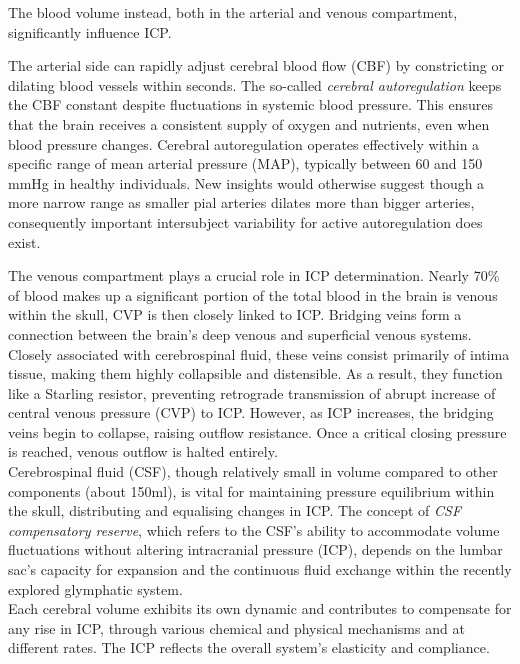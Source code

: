 The blood volume instead, both in the arterial and venous compartment, significantly influence ICP. 

The arterial side can rapidly adjust cerebral blood flow (CBF) by constricting or dilating blood vessels within seconds. The so-called \textit{cerebral autoregulation} keeps the CBF constant despite fluctuations in systemic blood pressure. This ensures that the brain receives a consistent supply of oxygen and nutrients, even when blood pressure changes. Cerebral autoregulation operates effectively within a specific range of mean arterial pressure (MAP), typically between 60 and 150 mmHg in healthy individuals. New insights would otherwise suggest though a more narrow range as smaller pial arteries dilates more than bigger arteries, consequently important intersubject variability for active autoregulation does exist\cite{kleinDifferentialHemodynamicResponse2022}. 

The venous compartment plays a crucial role in ICP determination. Nearly 70\% of blood makes up a significant portion of the total blood in the brain is venous within the skull, CVP is then closely linked to ICP. Bridging veins form a connection between the brain’s deep venous and superficial venous systems. Closely associated with cerebrospinal fluid, these veins consist primarily of intima tissue, making them highly collapsible and distensible. As a result, they function like a Starling resistor, preventing retrograde transmission of abrupt increase of central venous pressure (CVP) to ICP. However, as ICP increases, the bridging veins begin to collapse, raising outflow resistance. Once a critical closing pressure is reached, venous outflow is halted entirely\cite{wilsonMonroKellie20Dynamic2016}.\\

Cerebrospinal fluid (CSF), though relatively small in volume compared to other components (about 150ml), is vital for maintaining pressure equilibrium within the skull, distributing and equalising changes in ICP. The concept of \textit{CSF compensatory reserve}, which refers to the CSF’s ability to accommodate volume fluctuations without altering intracranial pressure (ICP), depends on the lumbar sac’s capacity for expansion and the continuous fluid exchange within the recently explored glymphatic system\cite{cuccioliniIntracranialPressureClinicians2023a}.\\

Each cerebral volume exhibits its own dynamic and contributes to compensate for any rise in ICP, through various chemical and physical mechanisms and at different rates. The ICP reflects the overall system’s elasticity and compliance.\\

